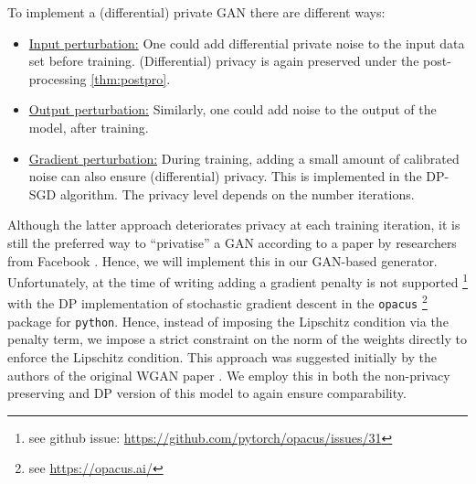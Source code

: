 To implement a (differential) private GAN there are different ways:
\begin{itemize}
    \item \underline{Input perturbation:} One could add differential private noise to the input data set before training. (Differential) privacy is again preserved under the post-processing \cref{thm:postpro}.
    \item \underline{Output perturbation:} Similarly, one could add noise to the output of the model, after training. 
    \item \underline{Gradient perturbation:} During training, adding a small amount of calibrated noise can also ensure (differential) privacy. This is implemented in the DP-SGD algorithm. The privacy level depends on the number iterations. 
\end{itemize}
Although the latter approach deteriorates privacy at each training iteration, it is still the preferred way to ``privatise'' a GAN according to a paper by researchers from Facebook \parencite{vandermaaten2020tradeoffs}. Hence, we will implement this in our GAN-based generator. Unfortunately, at the time of writing adding a gradient penalty is not supported \footnote{see github issue: \href{https://github.com/pytorch/opacus/issues/31}{https://github.com/pytorch/opacus/issues/31}} with the DP implementation of stochastic gradient descent in the \texttt{opacus} \footnote{see \href{https://opacus.ai/}{https://opacus.ai/}} package for \texttt{python}. Hence, instead of imposing the Lipschitz condition via the penalty term, we impose a strict constraint on the norm of the weights directly to enforce the Lipschitz condition. This approach was suggested initially by the authors of the original WGAN paper \parencite{arjovsky2017wasserstein}. We employ this in both the non-privacy preserving and DP version of this model to again ensure comparability.


